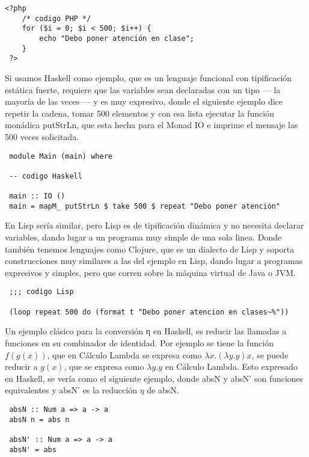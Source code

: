 \documentclass[11pt]{article}
\begin{document}
\begin{verbatim}
<?php
    /* codigo PHP */
    for ($i = 0; $i < 500; $i++) {
        echo "Debo poner atención en clase";
    }
 ?>
\end{verbatim}

Si usamos Haskell como ejemplo, que es un lenguaje funcional con
tipificación estática fuerte, requiere que las variables sean
declaradas con un tipo — la mayoría de las veces — y es muy expresivo,
donde el siguiente ejemplo dice repetir la cadena, tomar 500 elementos
y con esa lista ejecutar la función monádica putStrLn, que esta hecha
para el Monad IO e imprime  el mensaje las 500 veces solicitada.


\begin{verbatim}
 module Main (main) where

 -- codigo Haskell

 main :: IO ()
 main = mapM_ putStrLn $ take 500 $ repeat "Debo poner atención"
\end{verbatim}


En Lisp sería similar, pero Lisp es de tipificación dinámica y no
necesita declarar variables, dando lugar a un programa muy simple de
una sola linea.  Donde también tenemos lenguajes como Clojure, que es
un dialecto de Lisp y soporta construcciones muy similares a las del
ejemplo en Lisp, dando lugar a programas expresivos y simples, pero
que corren sobre la máquina virtual de Java o JVM.


\begin{verbatim}
 ;;; codigo Lisp

 (loop repeat 500 do (format t "Debo poner atencion en clases~%"))
\end{verbatim}


Un ejemplo clásico para la conversión η en Haskell, es reducir las
llamadas a funciones en su combinador de identidad. Por ejemplo se
tiene la función \(f(g(x))\), que en Cálculo Lambda se expresa como
\(λx.(λy.y)x\), se puede reducir a \(g(x)\), que se expresa como \(λy.y\) en
Cálculo Lambda. Esto expresado en Haskell, se vería como el siguiente
ejemplo, donde absN y absN’ son funciones equivalentes y absN’ es la
reducción \(η\) de absN.



\begin{verbatim}
 absN :: Num a => a -> a
 absN n = abs n

 absN' :: Num a => a -> a
 absN' = abs
\end{verbatim}
\end{document}
